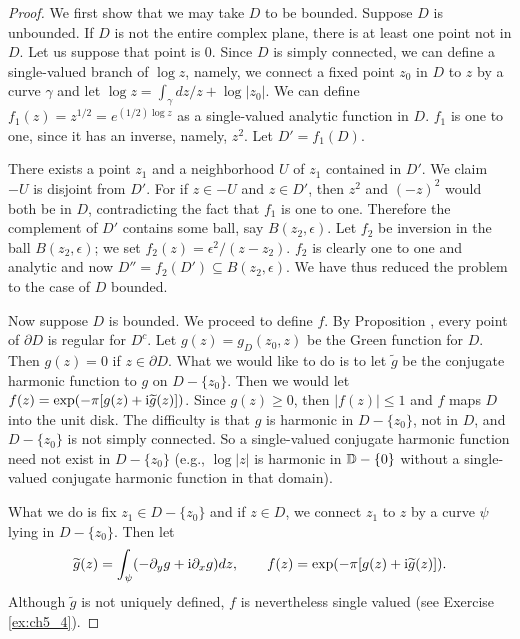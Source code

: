 \begin{proof}
We first show that we may take $D$ to be bounded. Suppose $D$ is unbounded. If $D$ is not the entire complex plane, there is at least one point not in $D$. Let us suppose that point is $0$. Since $D$ is simply connected, we can define a single-valued branch of $\log z$, namely, we connect a fixed point $z_0$ in $D$ to $z$ by a curve $\gamma$ and let $\log z = \int_\gamma dz/z + \log|z_0|$. We can define $f_1(z) = z^{1/2} = e^{(1/2)\log z}$ as a single-valued analytic function in $D$. $f_1$ is one to one, since it has an inverse, namely, $z^2$. Let $D' = f_1(D)$.

There exists a point $z_1$ and a neighborhood $U$ of $z_1$ contained in $D'$. We claim $-U$ is disjoint from $D'$. For if $z \in -U$ and $z \in D'$, then $z^2$ and $(-z)^2$ would both be in $D$, contradicting the fact that $f_1$ is one to one. Therefore the complement of $D'$ contains some ball, say $B(z_2,\epsilon)$. Let $f_2$ be inversion in the ball $B(z_2,\epsilon)$; we set $f_2(z) = \epsilon^2/(z-z_2)$. $f_2$ is clearly one to one and analytic and now $D'' = f_2(D') \subseteq B(z_2,\epsilon)$. We have thus reduced the problem to the case of $D$ bounded.


Now suppose $D$ is bounded. We proceed to define $f$. By Proposition , every point of $\partial D$ is regular for $D^c$. Let $g(z) = g_D(z_0,z)$ be the Green function for $D$. Then $g(z) = 0$ if $z \in \partial D$. What we would like to do is to let $\widetilde{g}$ be the conjugate harmonic function to $g$ on $D-\{z_0\}$. Then we would let $f(z) = \exp(-\pi[g(z) + \mathrm{i}\widetilde{g}(z)])$. Since $g(z) \geq 0$, then $|f(z)| \leq 1$ and $f$ maps $D$ into the unit disk. The difficulty is that $g$ is harmonic in $D-\{z_0\}$, not in $D$, and $D-\{z_0\}$ is not simply connected. So a single-valued conjugate harmonic function need not exist in $D-\{z_0\}$ (e.g., $\log|z|$ is harmonic in $\mathbb{D}-\{0\}$ without a single-valued conjugate harmonic function in that domain).

What we do is fix $z_1 \in D-\{z_0\}$ and if $z \in D$, we connect $z_1$ to $z$ by a curve $\psi$ lying in $D-\{z_0\}$. Then let
\begin{equation}\label{eq:ch5_1.8}
    \widetilde{g}(z) = \int_\psi (-\partial_y g + \mathrm{i}\partial_x g)dz, \qquad f(z) = \exp(-\pi[g(z) + \mathrm{i}\widetilde{g}(z)]).
\end{equation}
Although $\widetilde{g}$ is not uniquely defined, $f$ is nevertheless single valued (see Exercise \ref{ex:ch5_4}).


\end{proof}
